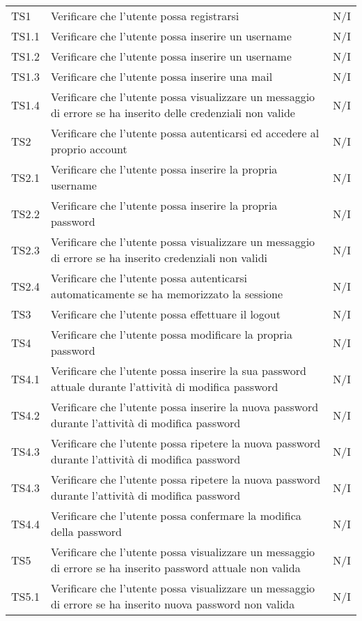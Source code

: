 {\begin{longtable}{C{.3\freewidth} C{.5\freewidth} C{.3\freewidth}}
    TS1 & Verificare che l'utente possa registrarsi & N/I  \\ 
    TS1.1 & Verificare che l'utente possa inserire un username & N/I  \\
    TS1.2 & Verificare che l'utente possa inserire un username & N/I  \\
    TS1.3 & Verificare che l'utente possa inserire una mail & N/I  \\
    TS1.4 & Verificare che l'utente possa visualizzare un messaggio di errore se ha inserito delle credenziali non valide & N/I  \\
    TS2 & Verificare che l'utente possa autenticarsi ed accedere al proprio account & N/I  \\
    TS2.1 & Verificare che l'utente possa inserire la propria username & N/I  \\
    TS2.2 & Verificare che l'utente possa inserire la propria password & N/I  \\
    TS2.3 & Verificare che l'utente possa visualizzare un messaggio di errore se ha inserito credenziali non validi & N/I  \\
    TS2.4 & Verificare che l'utente possa autenticarsi automaticamente se ha memorizzato la sessione  & N/I  \\
    TS3 & Verificare che l'utente possa effettuare il logout & N/I  \\
    TS4 & Verificare che l'utente possa modificare la propria password & N/I  \\
    TS4.1 & Verificare che l'utente possa inserire la sua password attuale durante l'attività di modifica password & N/I  \\
    TS4.2 & Verificare che l'utente possa inserire la nuova password durante l'attività di modifica password & N/I  \\
    TS4.3 & Verificare che l'utente possa ripetere la nuova password durante l'attività di modifica password & N/I  \\
    TS4.3 & Verificare che l'utente possa ripetere la nuova password durante l'attività di modifica password& N/I  \\
    TS4.4 & Verificare che l'utente possa confermare la modifica della password & N/I  \\
    TS5 & Verificare che l'utente possa visualizzare un messaggio di errore se ha inserito password attuale  non valida & N/I  \\
    TS5.1 & Verificare che l'utente possa visualizzare un messaggio di errore se ha inserito nuova password non valida & N/I  \\

\end{longtable}}
